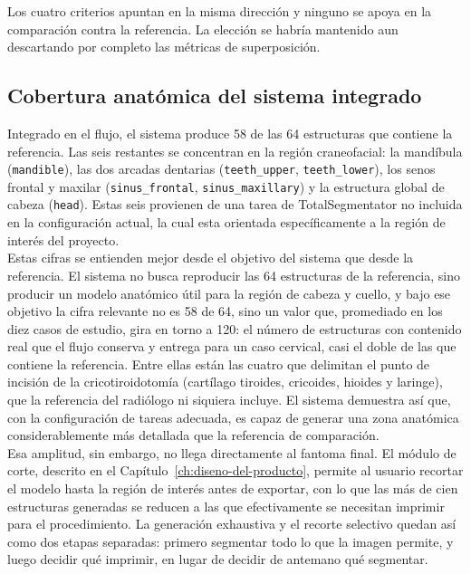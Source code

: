Los cuatro criterios apuntan en la misma dirección y ninguno se apoya en la comparación contra la referencia. La elección se habría mantenido aun descartando por completo las métricas de superposición.\\

\subsection{Cobertura anatómica del sistema integrado}

Integrado en el flujo, el sistema produce 58 de las 64 estructuras que contiene la referencia. Las seis restantes se concentran en la región craneofacial: la mandíbula (\texttt{mandible}), las dos arcadas dentarias (\texttt{teeth\_upper}, \texttt{teeth\_lower}), los senos frontal y maxilar (\texttt{sinus\_\-frontal}, \texttt{sinus\_maxillary}) y la estructura global de cabeza (\texttt{head}). Estas seis provienen de una tarea de TotalSegmentator no incluida en la configuración actual, la cual esta orientada específicamente a la región de interés del proyecto.\\

Estas cifras se entienden mejor desde el objetivo del sistema que desde la referencia. El sistema no busca reproducir las 64 estructuras de la referencia, sino producir un modelo anatómico útil para la región de cabeza y cuello, y bajo ese objetivo la cifra relevante no es 58 de 64, sino un valor que, promediado en los diez casos de estudio, gira en torno a 120: el número de estructuras con contenido real que el flujo conserva y entrega para un caso cervical, casi el doble de las que contiene la referencia. Entre ellas están las cuatro que delimitan el punto de incisión de la cricotiroidotomía (cartílago tiroides, cricoides, hioides y laringe), que la referencia del radiólogo ni siquiera incluye. El sistema demuestra así que, con la configuración de tareas adecuada, es capaz de generar una zona anatómica considerablemente más detallada que la referencia de comparación.\\

Esa amplitud, sin embargo, no llega directamente al fantoma final. El módulo de corte, descrito en el Capítulo~\ref{ch:diseno-del-producto}, permite al usuario recortar el modelo hasta la región de interés antes de exportar, con lo que las más de cien estructuras generadas se reducen a las que efectivamente se necesitan imprimir para el procedimiento. La generación exhaustiva y el recorte selectivo quedan así como dos etapas separadas: primero segmentar todo lo que la imagen permite, y luego decidir qué imprimir, en lugar de decidir de antemano qué segmentar.\\

